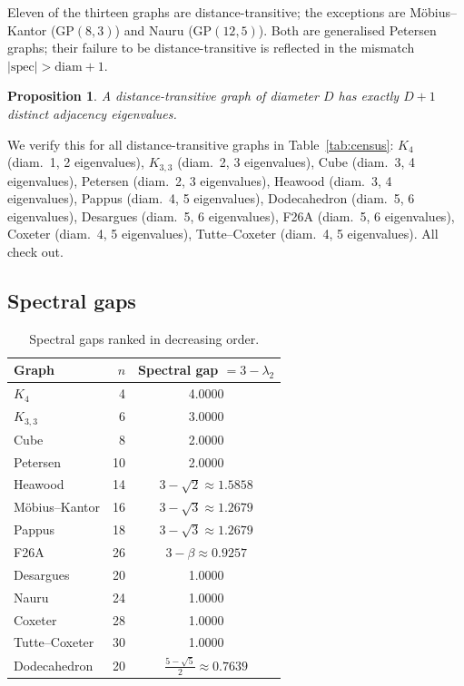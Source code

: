\documentclass[11pt,a4paper]{article}
\newtheorem{proposition}[theorem]{Proposition}
\begin{document}
Eleven of the thirteen graphs are distance-transitive; the exceptions are M\"{o}bius--Kantor ($\mathrm{GP}(8,3)$) and Nauru ($\mathrm{GP}(12,5)$). Both are generalised Petersen graphs; their failure to be distance-transitive is reflected in the mismatch $|\mathrm{spec}| > \mathrm{diam}+1$.

\begin{proposition}
A distance-transitive graph of diameter $D$ has exactly $D+1$ distinct adjacency eigenvalues.
\end{proposition}

We verify this for all distance-transitive graphs in Table~\ref{tab:census}: $K_4$ (diam.~1, 2 eigenvalues), $K_{3,3}$ (diam.~2, 3 eigenvalues), Cube (diam.~3, 4 eigenvalues), Petersen (diam.~2, 3 eigenvalues), Heawood (diam.~3, 4 eigenvalues), Pappus (diam.~4, 5 eigenvalues), Dodecahedron (diam.~5, 6 eigenvalues), Desargues (diam.~5, 6 eigenvalues), F26A (diam.~5, 6 eigenvalues), Coxeter (diam.~4, 5 eigenvalues), Tutte--Coxeter (diam.~4, 5 eigenvalues). All check out.

\subsection{Spectral gaps}

\begin{table}[htbp]
\centering
\caption{Spectral gaps ranked in decreasing order.}
\label{tab:gaps}
\begin{tabular}{lrc}
\toprule
Graph & $n$ & Spectral gap $= 3 - \lambda_2$ \\
\midrule
$K_4$              &  4 & 4.0000 \\
$K_{3,3}$          &  6 & 3.0000 \\
Cube               &  8 & 2.0000 \\
Petersen           & 10 & 2.0000 \\
Heawood            & 14 & $3 - \sqrt{2} \approx 1.5858$ \\
M\"{o}bius--Kantor & 16 & $3 - \sqrt{3} \approx 1.2679$ \\
Pappus             & 18 & $3 - \sqrt{3} \approx 1.2679$ \\
F26A               & 26 & $3 - \beta \approx 0.9257$ \\
Desargues          & 20 & 1.0000 \\
Nauru              & 24 & 1.0000 \\
Coxeter            & 28 & 1.0000 \\
Tutte--Coxeter     & 30 & 1.0000 \\
Dodecahedron       & 20 & $\tfrac{5-\sqrt{5}}{2} \approx 0.7639$ \\
\bottomrule
\end{tabular}
\end{table}
\end{document}
